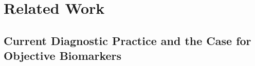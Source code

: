 %

\section{Related Work}
\label{sec:2}

\subsection{Current Diagnostic Practice and the Case for Objective Biomarkers}
\label{sec:2.1}

